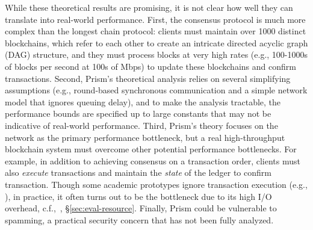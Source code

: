 While these theoretical results are promising, it is not clear how well they can translate into real-world performance. First, the \prism consensus protocol is much more complex than the longest chain protocol: clients must maintain over 1000 distinct blockchains, which refer to each other to create an intricate directed acyclic graph (DAG) structure, and they must process blocks at very high rates (e.g., 100-1000s of blocks per second at 100s of Mbps) to update these blockchains and confirm transactions. Second, Prism's theoretical analysis relies on several simplifying assumptions (e.g., round-based synchronous communication and a simple network model that ignores queuing delay), and to make the analysis tractable, the performance bounds are specified up to large constants that may not be indicative of real-world performance. Third, Prism's theory focuses on the network as the primary performance bottleneck, but a real high-throughput blockchain system must overcome other potential performance bottlenecks. For example, in addition to achieving consensus on a transaction order, clients must also {\em execute} transactions and maintain the {\em state} of the ledger to confirm transaction. Though some academic prototypes ignore transaction execution (e.g., \cite{ohiecode, conflux}),
in practice, it often turns out to be the bottleneck due to its high I/O overhead, c.f.,~\cite{raju2018mlsm},  \S\ref{sec:eval-resource}.
Finally, Prism could be vulnerable to spamming, a practical security concern that has not been fully analyzed. 



